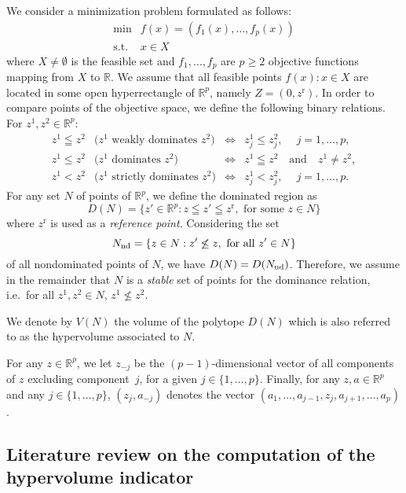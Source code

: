 \documentclass[a4paper,11pt]{article}
\newcommand{\R}{\ensuremath{\mathds{R}}}
\newcommand{\Obj}{f}
\newcommand{\BM}{z^{\text{r}}}
\newcommand{\Bzero}{0}
\begin{document}
We consider a minimization problem formulated as follows:
\begin{equation}\label{eq:MOP}
\begin{array}{ll} 
\min        & \Obj(x)=(\Obj_1(x),\dots,\Obj_p(x)) \\
\mbox{s.t.} & x \in X
\end{array}
\end{equation}
where $X \neq \emptyset$ is the feasible set and 
$f_1, \dots, f_p$ are $p \geq 2$ objective functions mapping from $X$ to $\R$.
We assume that all feasible points $f(x):x\in X$ are located 
in some open hyperrectangle of $\R^p$,
namely $Z = (\Bzero, \BM)$.
In order to compare points of the objective space, 
we define the following binary relations. For $z^1, z^2 \in \R^{p}$:
$$
\begin{array}{cccc}
z^1 \leqq z^2 & \text{($z^1$ weakly dominates $z^2$)} & \Leftrightarrow & z^1_j \leq z^2_j, \quad \
  j=1,\dots,p,\\
z^1 \leq z^2  & \text{($z^1$ dominates $z^2$)} & \Leftrightarrow & z^1 \leqq z^2 
\quad \mbox{and} \quad z^1 \neq z^2, \\
z^1 < z^2     & \text{($z^1$ strictly dominates $z^2$)} & \Leftrightarrow & z^1_{j} < z^2_{j}, \quad  \ j
= 1,\dots, p.
\end{array}
$$
For any set $N$ of points of $\R^p$, we define the dominated region as
$$D(N) = \{z'\in \R^p: z \leqq z' \leqq \BM,\text{ for some $z\in N$}\}$$
where $\BM$ is used as a \emph{reference point}.
Considering the set 
$$N_{\rm nd}=\{z\in N: z'\not\leq z,\text{ for all $z'\in N$}\}$$
of all nondominated points of $N$, 
we have $D(N) = D(N_{\rm nd})$. 
Therefore, we assume in the remainder that $N$ is a \emph{stable} set of points 
for the dominance relation,
i.e.\ for all $z^1, z^2 \in N$, $z^1 \not \leq z^2$.

We denote by $V(N)$ the volume of the polytope $D(N)$ 
which is also referred to as the hypervolume 
associated to $N$.

For any $z\in\R^p$, we let $z_{-j}$ be the $(p-1)$-dimensional
vector of all components of $z$ excluding component~$j$, for a given
$j\in\{1,\dots,p\}$. 
Finally, for any $z,a\in\R^{p}$ and any $j\in\{1,\dots,p\}$, $(z_{j},a_{-j})$
denotes the vector $(a_{1},\dots,a_{j-1},z_{j},a_{j+1},\dots,a_{p})$.


\subsection{Literature review on the computation of the hypervolume indicator}\label{sec:prev_algo}
\end{document}
